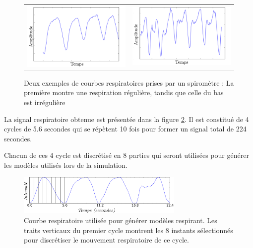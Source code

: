 \begin{figure}
 \centering
 \begin{tabular}{c c}
 \includegraphics[width=8cm]{images/respiReguliere} &
 \includegraphics[width=8cm]{images/respiIrreguliere}
 \end{tabular}
 \caption[Exemple de courbes respiratoires régulière et irrégulière]{Deux exemples de courbes respiratoires prises par un spiromètre : La première montre une respiration régulière, tandis que celle du bas est irrégulière}
 \label{fig:variabCycle}
\end{figure}


La signal respiratoire obtenue est présentée dans la figure \ref{fig:cycleRespi}. Il est constitué de 4 cycles de 5.6 secondes qui se répètent 10 fois pour former un signal total de 224 secondes. 

Chacun de ces 4 cycle est discrétisé en 8 parties qui seront utilisées pour générer les modèles utilisés lors de la simulation. 


\begin{figure}
 \centering
 \includegraphics[width=8cm]{images/courbesRespi}

 \caption[signal respiratoire utilisé pour les modèles de la base de donnée]{Courbe respiratoire utilisée pour générer modèles respirant. Les traits verticaux du premier cycle montrent les 8 instants sélectionnés pour discrétiser le mouvement respiratoire de ce cycle.}
 \label{fig:cycleRespi}
\end{figure}

